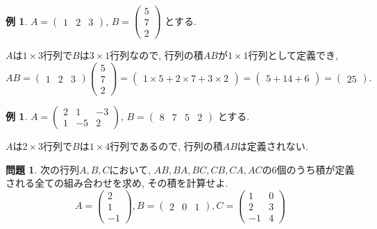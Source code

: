 \documentclass[dvipdfmx,a4paper,11pt]{article} %
\theoremstyle{definition}
\newtheorem{exa}[thm]{例}
\newtheorem{ques}[thm]{問題}
\begin{document}
 
 \begin{exa}
 $ A=\begin{pmatrix} 1 &2 &3 \end{pmatrix}$, 
 $ 
 B = 
 \begin{pmatrix}
5 \\7\\2
 \end{pmatrix}
 $
 とする. 
 
 $A$は$1\times 3$行列で$B$は$3 \times 1$行列なので, 行列の積$AB$が$1 \times 1$行列として定義でき, 
 $$
 AB = \begin{pmatrix}1 &2&3  \end{pmatrix}
 \begin{pmatrix}
5 \\7\\2
 \end{pmatrix}
 = \begin{pmatrix}1\times 5 + 2 \times 7 + 3 \times 2  \end{pmatrix}= 
  \begin{pmatrix}5+14+6 \end{pmatrix}= \begin{pmatrix}25 \end{pmatrix}.
 $$
 
 \end{exa}


  \begin{exa}
 $ A= 
 \begin{pmatrix}
2 & 1&-3\\
1 & -5 & 2
 \end{pmatrix}
 $, $
 B = 
  \begin{pmatrix}
8 & 7&5 & 2
 \end{pmatrix}
 $
 とする. 
 
 $A$は$2 \times 3$行列で$B$は$1 \times 4$行列であるので, 行列の積$AB$は定義されない.
 \end{exa}
 
 \begin{ques}
 次の行列$A,B,C$において, $AB, BA, BC, CB, CA, AC$の6個のうち積が定義される全ての組み合わせを求め, その積を計算せよ.
 $$
  A=\begin{pmatrix}
 2 \\ 1\\-1
 \end{pmatrix}, 
 B=
  \begin{pmatrix}
 2 &0&1 
 \end{pmatrix}, 
 C= \begin{pmatrix}
  1&0\\
 2&3\\
 -1&4
 \end{pmatrix}
 $$
 \end{ques}
 
\end{document}
